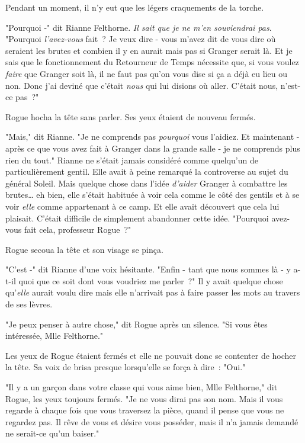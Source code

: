 Pendant un moment, il n'y eut que les légers craquements de la torche.

"Pourquoi -" dit Rianne Felthorne. \emph{Il sait que je ne m'en souviendrai pas}. "Pourquoi \emph{l'avez-vous} fait~? Je veux dire - vous m'avez dit de vous dire où seraient les brutes et combien il y en aurait mais pas si Granger serait là. Et je sais que le fonctionnement du Retourneur de Temps nécessite que, si vous voulez \emph{faire} que Granger soit là, il ne faut pas qu'on vous dise si ça a déjà eu lieu ou non. Donc j'ai deviné que c'était \emph{nous} qui lui disions où aller. C'était nous, n'est-ce pas~?"

Rogue hocha la tête sans parler. Ses yeux étaient de nouveau fermés.

"Mais," dit Rianne. "Je ne comprends pas \emph{pourquoi} vous l'aidiez. Et maintenant - après ce que vous avez fait à Granger dans la grande salle - je ne comprends plus rien du tout." Rianne ne s'était jamais considéré comme quelqu'un de particulièrement gentil. Elle avait à peine remarqué la controverse au sujet du général Soleil. Mais quelque chose dans l'idée \emph{d'aider} Granger à combattre les brutes… eh bien, elle s'était habituée à voir cela comme le côté des gentils et à se voir \emph{elle} comme appartenant à ce camp. Et elle avait découvert que cela lui plaisait. C'était difficile de simplement abandonner cette idée. "Pourquoi avez-vous fait cela, professeur Rogue~?"

Rogue secoua la tête et son visage se pinça.

"C'est -" dit Rianne d'une voix hésitante. "Enfin - tant que nous sommes là - y a-t-il quoi que ce soit dont vous voudriez me parler~?" Il y avait quelque chose qu'\emph{elle} aurait voulu dire mais elle n'arrivait pas à faire passer les mots au travers de ses lèvres.

"Je peux penser à autre chose," dit Rogue après un silence. "Si vous êtes intéressée, Mlle Felthorne."

Les yeux de Rogue étaient fermés et elle ne pouvait donc se contenter de hocher la tête. Sa voix de brisa presque lorsqu'elle se força à dire~: "Oui."

"Il y a un garçon dans votre classe qui vous aime bien, Mlle Felthorne," dit Rogue, les yeux toujours fermés. "Je ne vous dirai pas son nom. Mais il vous regarde à chaque fois que vous traversez la pièce, quand il pense que vous ne regardez pas. Il rêve de vous et désire vous posséder, mais il n'a jamais demandé ne serait-ce qu'un baiser."

